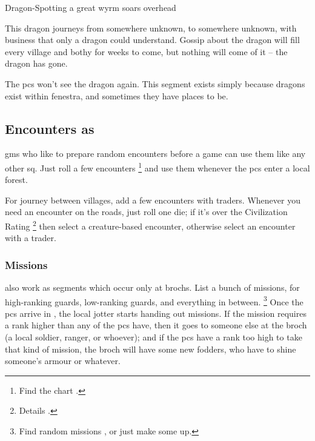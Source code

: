 \begin{multicols}{2}
{Dragon-Spotting}%
{a great wyrm soars overhead}%

This dragon journeys from somewhere unknown, to somewhere unknown, with business that only a dragon could understand.
Gossip about the dragon will fill every \gls{village} and \gls{bothy} for weeks to come, but nothing will come of it -- the dragon has gone.

The \glspl{pc} won't see the dragon again.
This \gls{segment} exists simply because dragons exist within \gls{fenestra}, and sometimes they have places to be.

\stopcontents[sq]

\subsection{Encounters as }

\Glspl{gm} who like to prepare random encounters before a game can use them like any other \gls{sq}.
Just roll a few encounters%
\footnote{Find the chart .}
and use them whenever the \glspl{pc} enter a local forest.

For journey between \glspl{village}, add a few encounters with traders.
Whenever you need an encounter on the roads, just roll one die; if it's over the Civilization Rating%
\footnote{Details .}
then select a creature-based encounter, otherwise select an encounter with a trader.

\subsubsection{Missions}
also work as \glspl{segment} which occur only at \glspl{broch}.
List a bunch of missions, for high-ranking \glspl{guard}, low-ranking \glspl{guard}, and everything in between.%
\footnote{Find random missions , or just make some up.}
Once the \glspl{pc} arrive in , the local \gls{jotter} starts handing out missions.
If the mission requires a rank higher than any of the \glspl{pc} have, then it goes to someone else at the \gls{broch} (a local \gls{soldier}, \gls{ranger}, or whoever); and if the \glspl{pc} have a rank too high to take that kind of mission, the \gls{broch} will have some new \glspl{fodder}, who have to shine someone's armour or whatever.


\end{multicols}

